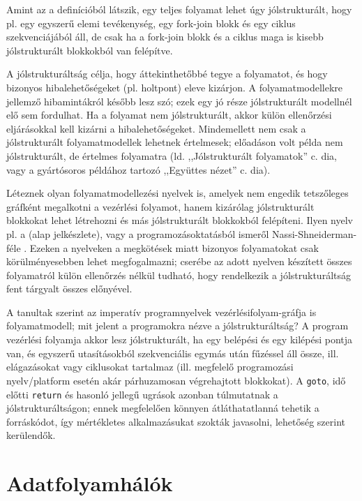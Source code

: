 Amint az a definícióból látszik, egy teljes folyamat lehet úgy jólstrukturált, hogy pl. egy egyszerű elemi tevékenység, egy fork-join blokk és egy ciklus szekvenciájából áll, de csak ha a fork-join blokk és a ciklus maga is kisebb jólstrukturált blokkokból van felépítve.

A jólstrukturáltság célja, hogy áttekinthetőbbé tegye a folyamatot, és hogy bizonyos hibalehetőségeket (pl. holtpont) eleve kizárjon. A folyamatmodellekre jellemző hibamintákról később lesz szó; ezek egy jó része jólstrukturált modellnél elő sem fordulhat. Ha a folyamat nem jólstrukturált, akkor külön ellenőrzési eljárásokkal kell kizárni a hibalehetőségeket. Mindemellett nem csak a jólstrukturált folyamatmodellek lehetnek értelmesek; előadáson volt példa nem jólstrukturált, de értelmes folyamatra (ld. ,,Jólstrukturált folyamatok'' c. dia, vagy a gyártósoros példához tartozó ,,Együttes nézet'' c. dia).

Léteznek olyan folyamatmodellezési nyelvek is, amelyek nem engedik tetszőleges gráfként megalkotni a vezérlési folyamot, hanem kizárólag jólstrukturált blokkokat lehet létrehozni és más jólstrukturált blokkokból felépíteni. Ilyen nyelv pl. a  (alap jelkészlete), vagy a programozásoktatásból ismeről Nassi-Shneiderman-féle . Ezeken a nyelveken a megkötések miatt bizonyos folyamatokat csak körülményesebben lehet megfogalmazni; cserébe az adott nyelven készített összes folyamatról külön ellenőrzés nélkül tudható, hogy rendelkezik a jólstrukturáltság fent tárgyalt összes előnyével.

A tanultak szerint az imperatív programnyelvek vezérlésifolyam-gráfja is folyamatmodell; mit jelent a programokra nézve a jólstrukturáltság? A program vezérlési folyamja akkor lesz jólstrukturált, ha egy belépési és egy kilépési pontja van, és egyszerű utasításokból szekvenciális egymás után fűzéssel áll össze, ill. elágazásokat vagy ciklusokat tartalmaz (ill. megfelelő programozási nyelv/platform esetén akár párhuzamosan végrehajtott blokkokat). A \lstinline{goto}, idő előtti \lstinline{return} és hasonló jellegű ugrások azonban túlmutatnak a jólstrukturáltságon; ennek megfelelően könnyen átláthatatlanná tehetik a forráskódot, így mértékletes alkalmazásukat szokták javasolni, lehetőség szerint kerülendők.

\section{Adatfolyamhálók}

